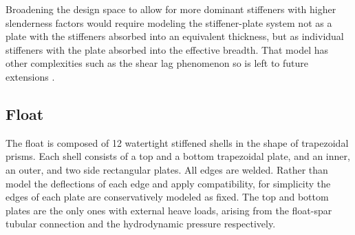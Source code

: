 \documentclass[a4paper,fleqn,colorlinks,unicode,lineno]{cas-dc} %
\begin{document}
Broadening the design space to allow for more dominant stiffeners with higher slenderness factors would require modeling the stiffener-plate system not as a plate with the stiffeners absorbed into an equivalent thickness, but as individual stiffeners with the plate absorbed into the effective breadth.
That model has other complexities such as the shear lag phenomenon so is left to future extensions \citep{wierzbicki_lecture_2013,american_iron_and_steel_institute_cold-formed_1991}.


\subsection{Float}
The float is composed of 12 watertight stiffened shells in the shape of trapezoidal prisms.
Each shell consists of a top and a bottom trapezoidal plate, and an inner, an outer, and two side rectangular plates.
All edges are welded.
Rather than model the deflections of each edge and apply compatibility, for simplicity the edges of each plate are conservatively modeled as fixed.
The top and bottom plates are the only ones with external heave loads, arising from the float-spar tubular connection and the hydrodynamic pressure respectively.
\end{document}
